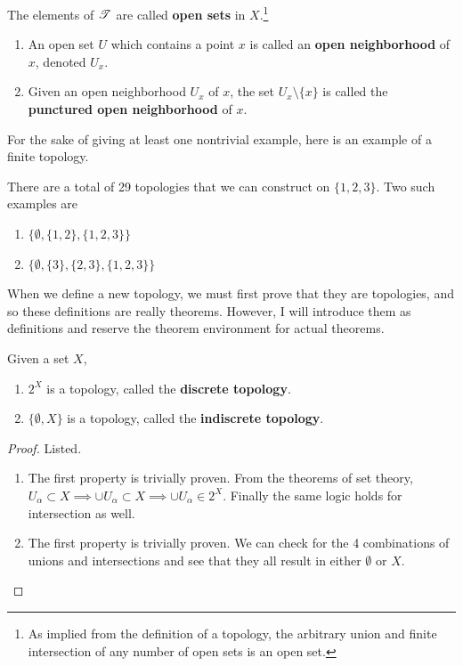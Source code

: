   \begin{definition}
    The elements of $\operatorname{\mathscr{T}}$ are called \textbf{open sets} in $X$.\footnote{As implied from the definition of a topology, the arbitrary union and finite intersection of any number of open sets is an open set.} 
    \begin{enumerate}
      \item An open set $U$ which contains a point $x$ is called an \textbf{open neighborhood} of $x$, denoted $U_x$. 
      \item Given an open neighborhood $U_x$ of $x$, the set $U_x \setminus \{x\}$ is called the \textbf{punctured open neighborhood} of $x$. 
    \end{enumerate}
  \end{definition}

  For the sake of giving at least one nontrivial example, here is an example of a finite topology. 

  \begin{example}
    There are a total of 29 topologies that we can construct on $\{1, 2, 3\}$. Two such examples are 
    \begin{enumerate}
      \item $\{\emptyset, \{1, 2\}, \{1, 2, 3\}\}$ 
      \item $\{\emptyset, \{3\}, \{2, 3\}, \{1, 2, 3\}\}$
    \end{enumerate}
  \end{example} 

  When we define a new topology, we must first prove that they are topologies, and so these definitions are really theorems. However, I will introduce them as definitions and reserve the theorem environment for actual theorems. 

  \begin{definition}
    Given a set $X$, 
    \begin{enumerate}
      \item $2^X$ is a topology, called the \textbf{discrete topology}. 
      \item $\{\emptyset, X \}$ is a topology, called the \textbf{indiscrete topology}. 
    \end{enumerate}
  \end{definition}
  \begin{proof}
    Listed. 
    \begin{enumerate}
      \item The first property is trivially proven. From the theorems of set theory, $U_\alpha \subset X \implies \cup U_\alpha \subset X \implies \cup U_\alpha \in 2^X$. Finally the same logic holds for intersection as well. 
      \item The first property is trivially proven. We can check for the 4 combinations of unions and intersections and see that they all result in either $\emptyset$ or $X$. 
    \end{enumerate}
  \end{proof}

